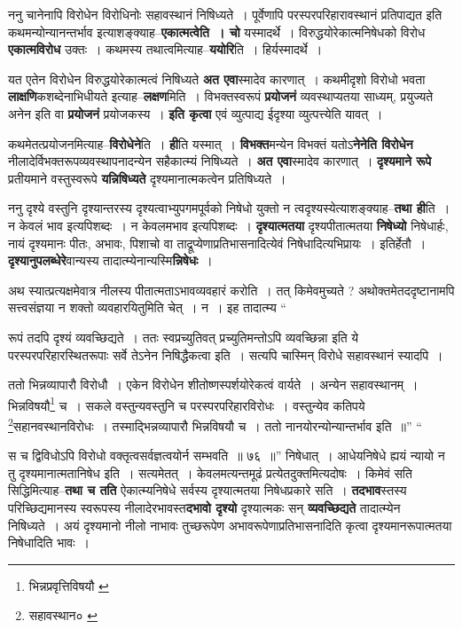 \documentclass[article,12pt,a4paper]{memoir}
\begin{document}
	  \pstart ननु चानेनापि विरोधेन विरोधिनोः सहावस्थानं निषिध्यते । पूर्वेणापि परस्परपरिहारावस्थानं प्रतिपाद्यत इति कथमन्योन्यानन्तर्भाव इत्याशङ्क्याह--\textbf{एकात्मत्वेति । चो} यस्मादर्थे । विरुद्धयोरेकात्मनिषेधको विरोध \textbf{एकात्मविरोध} उक्तः । कथमस्य तथात्वमित्याह--\textbf{ययोरि}ति । हिर्यस्मादर्थे ।
	\pend
      

	  \pstart यत एतेन विरोधेन विरुद्धयोरेकात्मत्वं निषिध्यते \textbf{अत एवा}स्मादेव कारणात् । कथमीदृशो विरोधो भवता \textbf{लाक्षणि}कशब्देनाभिधीयते इत्याह--\textbf{लक्षण}मिति । विभक्तस्वरूपं \textbf{प्रयोजनं} व्यवस्थाप्यतया साध्यम्, प्रयुज्यते अनेन इति वा \textbf{प्रयोजनं} प्रयोजकस्य । \textbf{इति कृत्वा} एवं व्युत्पाद्य ईदृश्या व्युत्पत्त्येति यावत् ।
	\pend
      

	  \pstart कथमेतत्प्रयोजनमित्याह--\textbf{विरोधेने}ति । \textbf{ही}ति यस्मात् । \textbf{विभक्त}मन्येन विभक्तं यतोऽ\textbf{नेनेति विरोधेन} नीलादेर्विभक्तरूपव्यवस्थापनादन्येन सहैकात्म्यं निषिध्यते । \textbf{अत एवा}स्मादेव कारणात् । \textbf{दृश्यमाने रूपे} प्रतीयमाने वस्तुस्वरूपे \textbf{यन्निषिध्यते} दृश्यमानात्मकत्वेन प्रतिषिध्यते ।
	\pend
      

	  \pstart ननु दृश्ये वस्तुनि दृश्यान्तरस्य दृश्यत्वाभ्युपगमपूर्वको निषेधो युक्तो न त्वदृश्यस्येत्याशङ्क्याह--\textbf{तथा ही}ति । न केवलं भाव इत्यपिशब्दः । न केवलमभाव इत्यपिशब्दः । \textbf{दृश्यात्मतया} दृश्यपीतात्मतया \textbf{निषेध्यो} निषेधार्हः, नायं दृश्यमानः पीतः, अभावः, पिशाचो वा ताद्रूप्येणाप्रतिभासनादित्येवं निषेधादित्यभिप्रायः । इतिर्हेतौ । \textbf{दृश्यानुपलब्धेरे}वान्यस्य तादात्म्येनान्यस्मि\textbf{न्निषेधः} ।
	\pend
      

	  \pstart अथ स्यात्प्रत्यक्षमेवात्र नीलस्य पीतात्मताऽभावव्यवहारं करोति । तत् किमेवमुच्यते ? अथोक्तमेतददृष्टानामपि सत्त्वसंज्ञया न शक्तो व्यवहारयितुमिति चेत् । न । इह तादात्म्य \leavevmode{} “
	  
	रूपं तदपि दृश्यं व्यवच्छिद्यते । ततः स्वप्रच्युतिवत् प्रच्युतिमन्तोऽपि व्यवच्छिन्ना इति ये परस्परपरिहारस्थितरूपाः सर्वे तेऽनेन निषिद्धैकत्वा इति । सत्यपि चास्मिन् विरोधे सहावस्थानं स्यादपि । 
	  
	ततो भिन्नव्यापारौ विरोधौ । एकेन विरोधेन शीतोष्णस्पर्शयोरेकत्वं वार्यते । अन्येन सहावस्थानम् । भिन्नविषयौ\footnote{भिन्नप्रवृत्तिविषयौ \cite{dp-msA} \cite{dp-edP} \cite{dp-edH} \cite{dp-edN}} च । सकले वस्तुन्यवस्तुनि च परस्परपरिहारविरोधः । वस्तुन्येव कतिपये \footnote{सहावस्थान० \cite{dp-msB} \cite{dp-msC}}सहानवस्थानविरोधः । तस्माद्भिन्नव्यापारौ भिन्नविषयौ च । ततो नानयोरन्योन्यान्तर्भाव इति ॥” “
	  
	स च द्विविधोऽपि विरोधो वक्तृत्वसर्वज्ञत्वयोर्न सम्भवति ॥ ७६ ॥” निषेधात् । आधेयनिषेधे ह्ययं न्यायो न तु दृश्यमानात्मतानिषेध इति । सत्यमेतत् । केवलमत्यन्तमूढं प्रत्येतदुक्तमित्यदोषः । किमेवं सति सिद्धिमित्याह--\textbf{तथा च तति} ऐकात्म्यनिषेधे सर्वस्य दृश्यात्मतया निषेधप्रकारे सति । \textbf{तदभाव}स्तस्य परिच्छिद्यमानस्य स्वरूपस्य नीलादेरभावस्त\textbf{दभावो दृश्यो} दृश्यात्म\leavevmode{}कः सन् \textbf{व्यवच्छिद्यते} तादात्म्येन निषिध्यते । अयं दृश्यमानो नीलो नाभावः तुच्छरूपेण अभावरूपेणाप्रतिभासनादिति कृत्वा दृश्यमानरूपात्मतया निषेधादिति भावः ।
	\pend
      
\end{document}
